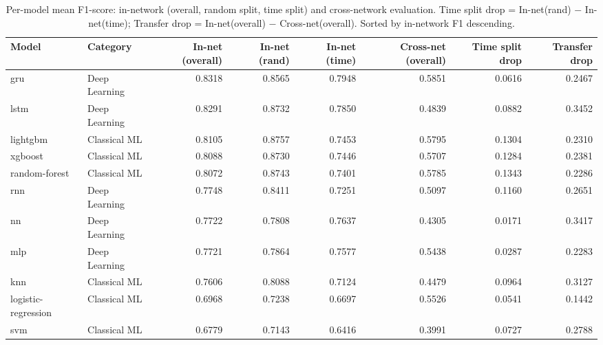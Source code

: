 \begin{table}
\caption{Per-model mean F1-score: in-network (overall, random split, time split) and cross-network evaluation. Time split drop = In-net(rand) $-$ In-net(time); Transfer drop = In-net(overall) $-$ Cross-net(overall). Sorted by in-network F1 descending.}
\label{tab:q5_per_model}
\begin{tabular}{llrrrrrr}
\toprule
Model & Category & In-net (overall) & In-net (rand) & In-net (time) & Cross-net (overall) & Time split drop & Transfer drop \\
\midrule
gru & Deep Learning & 0.8318 & 0.8565 & 0.7948 & 0.5851 & 0.0616 & 0.2467 \\
lstm & Deep Learning & 0.8291 & 0.8732 & 0.7850 & 0.4839 & 0.0882 & 0.3452 \\
lightgbm & Classical ML & 0.8105 & 0.8757 & 0.7453 & 0.5795 & 0.1304 & 0.2310 \\
xgboost & Classical ML & 0.8088 & 0.8730 & 0.7446 & 0.5707 & 0.1284 & 0.2381 \\
random-forest & Classical ML & 0.8072 & 0.8743 & 0.7401 & 0.5785 & 0.1343 & 0.2286 \\
rnn & Deep Learning & 0.7748 & 0.8411 & 0.7251 & 0.5097 & 0.1160 & 0.2651 \\
nn & Deep Learning & 0.7722 & 0.7808 & 0.7637 & 0.4305 & 0.0171 & 0.3417 \\
mlp & Deep Learning & 0.7721 & 0.7864 & 0.7577 & 0.5438 & 0.0287 & 0.2283 \\
knn & Classical ML & 0.7606 & 0.8088 & 0.7124 & 0.4479 & 0.0964 & 0.3127 \\
logistic-regression & Classical ML & 0.6968 & 0.7238 & 0.6697 & 0.5526 & 0.0541 & 0.1442 \\
svm & Classical ML & 0.6779 & 0.7143 & 0.6416 & 0.3991 & 0.0727 & 0.2788 \\
\bottomrule
\end{tabular}
\end{table}

